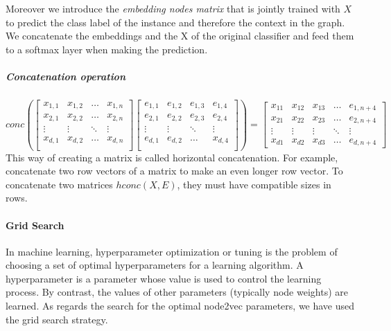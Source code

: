 \documentclass{report}
\begin{document}
Moreover we introduce the \textit{embedding nodes matrix} that is
jointly trained with $X$ to predict the class label of the instance and therefore the context in the graph. We concatenate the embeddings
and the X of the original classifier and feed them to a softmax layer when making the prediction.
\subparagraph{Concatenation operation}
\[
conc (
\begin{bmatrix}
    x_{1,1}       & x_{1,2} & \dots & x_{1 ,n} \\
    x_{2,1}       & x_{2,2} & \dots & x_{2 ,n} \\
    \vdots  & \vdots & \ddots & \vdots \\
    x_{d,1}       & x_{d,2} & \dots &x_{d ,n} \\
\end{bmatrix}
\begin{bmatrix}
    e_{1,1}       & e_{1,2} & e_{1,3} & e_{1,4}\\
    e_{2,1}       & e_{2,2} & e_{2,3} & e_{2,4}\\
    \vdots  & \vdots & \ddots & \vdots \\
    e_{d,1}    & e_{d,2} & \dots &x_{d ,4} \\
\end{bmatrix}
)
=
\begin{bmatrix}
    x_{11} & x_{12} & x_{13} & \dots  & e_{1,n+4} \\
    x_{21} & x_{22} & x_{23} & \dots  & e_{2,n+4} \\
    \vdots & \vdots & \vdots & \ddots & \vdots \\
    x_{d1} & x_{d2} & x_{d3} & \dots  & e_{d,n+4}
\end{bmatrix}
\]
This way of creating a matrix is called horizontal concatenation. For example, concatenate two row vectors of a matrix to make an even longer row vector. To concatenate two matrices $hconc(X,E)$, they must have compatible sizes in rows.
\paragraph{Grid Search}
In machine learning, hyperparameter optimization or tuning is the problem of choosing a set of optimal hyperparameters for a learning algorithm. A hyperparameter is a parameter whose value is used to control the learning process. By contrast, the values of other parameters (typically node weights) are learned.
As regards the search for the optimal node2vec parameters, we have used the grid search strategy.
\end{document}
